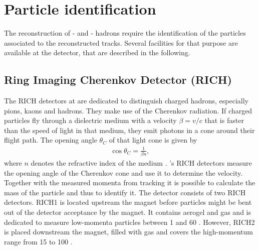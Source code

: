 \section{Particle identification}
The reconstruction of \bquark- and \cquark- hadrons require the identification of the particles associated to the reconstructed tracks.
Several facilities for that purpose are available at the \lhcb detector, that are described in the following.

\subsection{Ring Imaging Cherenkov Detector (RICH)}
The RICH detectors at \lhcb are dedicated to distinguish charged hadrons, especially pions, kaons and hadrons.
They make use of the Cherenkov radiation.
If charged particles fly through a dielectric medium with a velocity $\beta = v/c$ that is faster than the speed of light in that medium, they emit photons in a cone around their flight path.
The opening angle $\theta_C$ of that light cone is given by
\begin{align}
    \cos \theta_C = \frac{1}{\beta n},
\end{align}
where $n$ denotes the refractive index of the medium \cite{Jackson_ED}.
\lhcb's RICH detectors measure the opening angle of the Cherenkov cone and use it to determine the velocity.
Together with the measured momenta from tracking it is possible to calculate the mass of the particle and thus to identify it.
The \lhcb detector consists of two RICH detectors.
RICH1 is located upstream the magnet before particles might be bent out of the \lhcb detector acceptance by the magnet.
It contains aerogel and \cfourften gas and is dedicated to measure low-momenta particles between 1 \gev and 60 \gev.
However, RICH2 is placed downstream the magnet, filled with \cffour gas and covers the high-momentum range from 15 \gev to 100 \gev \cite{detector, RICH_Performance}.

